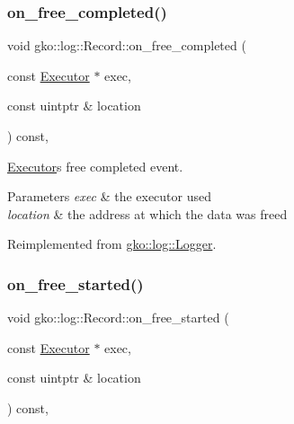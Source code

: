 \subsubsection{\texorpdfstring{on\+\_\+free\+\_\+completed()}{on\_free\_completed()}}
{\footnotesize\ttfamily void gko\+::log\+::\+Record\+::on\+\_\+free\+\_\+completed (\begin{DoxyParamCaption}\item[{const \hyperlink{classgko_1_1Executor}{Executor} $\ast$}]{exec,  }\item[{const uintptr \&}]{location }\end{DoxyParamCaption}) const\hspace{0.3cm}{\ttfamily [override]}, {\ttfamily [virtual]}}



\hyperlink{classgko_1_1Executor}{Executor}\textquotesingle{}s free completed event. 


\begin{DoxyParams}{Parameters}
{\em exec} & the executor used \\
\hline
{\em location} & the address at which the data was freed \\
\hline
\end{DoxyParams}


Reimplemented from \hyperlink{classgko_1_1log_1_1Logger}{gko\+::log\+::\+Logger}.

\mbox{\label{classgko_1_1log_1_1Record_a8504ad719285da3e6058ac4605c26f78}} 
\subsubsection{\texorpdfstring{on\+\_\+free\+\_\+started()}{on\_free\_started()}}
{\footnotesize\ttfamily void gko\+::log\+::\+Record\+::on\+\_\+free\+\_\+started (\begin{DoxyParamCaption}\item[{const \hyperlink{classgko_1_1Executor}{Executor} $\ast$}]{exec,  }\item[{const uintptr \&}]{location }\end{DoxyParamCaption}) const\hspace{0.3cm}{\ttfamily [override]}, {\ttfamily [virtual]}}




